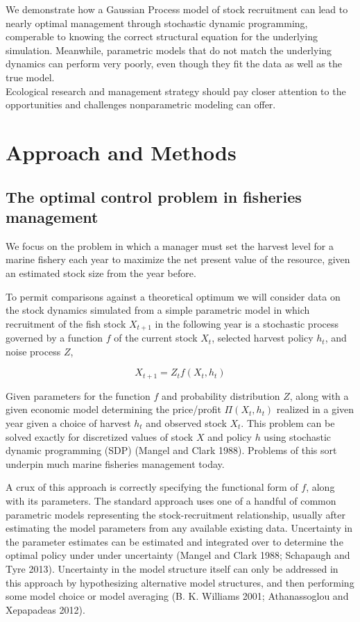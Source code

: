 \documentclass[author-year, review]{elsarticle} %
\begin{document}
We demonstrate how a Gaussian Process model of stock recruitment can
lead to nearly optimal management through stochastic dynamic
programming, comperable to knowing the correct structural equation for
the underlying simulation. Meanwhile, parametric models that do not
match the underlying dynamics can perform very poorly, even though they
fit the data as well as the true model.\\Ecological research and
management strategy should pay closer attention to the opportunities and
challenges nonparametric modeling can offer.

\section{Approach and Methods}\label{approach-and-methods-1}

\subsection{The optimal control problem in fisheries
management}\label{the-optimal-control-problem-in-fisheries-management}

We focus on the problem in which a manager must set the harvest level
for a marine fishery each year to maximize the net present value of the
resource, given an estimated stock size from the year before.

To permit comparisons against a theoretical optimum we will consider
data on the stock dynamics simulated from a simple parametric model in
which recruitment of the fish stock $X_{t+1}$ in the following year is a
stochastic process governed by a function $f$ of the current stock
$X_t$, selected harvest policy $h_t$, and noise process $Z$,

\[X_{t+1} = Z_t f(X_t, h_t) \]

Given parameters for the function $f$ and probability distribution $Z$,
along with a given economic model determining the price/profit
$\Pi(X_t, h_t)$ realized in a given year given a choice of harvest $h_t$
and observed stock $X_t$. This problem can be solved exactly for
discretized values of stock $X$ and policy $h$ using stochastic dynamic
programming (SDP) (Mangel and Clark 1988). Problems of this sort
underpin much marine fisheries management today.

A crux of this approach is correctly specifying the functional form of
$f$, along with its parameters. The standard approach uses one of a
handful of common parametric models representing the stock-recruitment
relationship, usually after estimating the model parameters from any
available existing data. Uncertainty in the parameter estimates can be
estimated and integrated over to determine the optimal policy under
under uncertainty (Mangel and Clark 1988; Schapaugh and Tyre 2013).
Uncertainty in the model structure itself can only be addressed in this
approach by hypothesizing alternative model structures, and then
performing some model choice or model averaging (B. K. Williams 2001;
Athanassoglou and Xepapadeas 2012).
\end{document}
